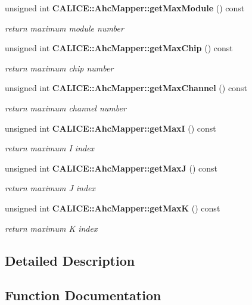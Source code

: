 \begin{DoxyCompactItemize}
unsigned int {\bf C\-A\-L\-I\-C\-E\-::\-Ahc\-Mapper\-::get\-Max\-Module} () const 
\begin{DoxyCompactList}\small\item\em return maximum module number \end{DoxyCompactList}\item 
unsigned int {\bf C\-A\-L\-I\-C\-E\-::\-Ahc\-Mapper\-::get\-Max\-Chip} () const 
\begin{DoxyCompactList}\small\item\em return maximum chip number \end{DoxyCompactList}\item 
unsigned int {\bf C\-A\-L\-I\-C\-E\-::\-Ahc\-Mapper\-::get\-Max\-Channel} () const 
\begin{DoxyCompactList}\small\item\em return maximum channel number \end{DoxyCompactList}\item 
unsigned int {\bf C\-A\-L\-I\-C\-E\-::\-Ahc\-Mapper\-::get\-Max\-I} () const 
\begin{DoxyCompactList}\small\item\em return maximum I index \end{DoxyCompactList}\item 
unsigned int {\bf C\-A\-L\-I\-C\-E\-::\-Ahc\-Mapper\-::get\-Max\-J} () const 
\begin{DoxyCompactList}\small\item\em return maximum J index \end{DoxyCompactList}\item 
unsigned int {\bf C\-A\-L\-I\-C\-E\-::\-Ahc\-Mapper\-::get\-Max\-K} () const 
\begin{DoxyCompactList}\small\item\em return maximum K index \end{DoxyCompactList}\end{DoxyCompactItemize}


\subsection{Detailed Description}


\subsection{Function Documentation}
